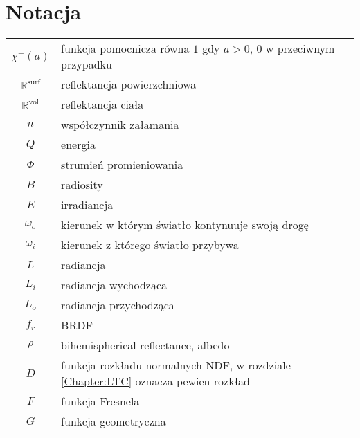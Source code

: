 \documentclass[../main.tex]{subfiles}
\begin{document}
\chapter*{Notacja}

\begin{tabularx}{\textwidth}{cl}
  $\chi^{+}(a)$ 
  & funkcja pomocnicza równa $1$ gdy $a>0$, 0 w przeciwnym przypadku \\
  
  $\mathbb{R}^{\text{surf}}$
  & reflektancja powierzchniowa \\
  
  $\mathbb{R}^{\text{vol}}$
  & reflektancja ciała \\
  
  $n$
  & współczynnik załamania \\
  
  $Q$
  & energia \\
  
  $\Phi$ 
  & strumień promieniowania \\
  
  $B$
  & radiosity \\
  
  $E$
  & irradiancja \\
  
  $\omega_o$
  & kierunek w którym światło kontynuuje swoją drogę \\
  
  $\omega_i$
  & kierunek z którego światło przybywa \\
  
  $L$
  & radiancja \\
  
  $L_i$
  & radiancja wychodząca \\
  
  $L_o$
  & radiancja przychodząca \\
  
  $f_r$
  & BRDF \\
  
  $\rho$ 
  & bihemispherical reflectance, albedo \\
  
  $D$
  & funkcja rozkładu normalnych NDF, w rozdziale \ref{Chapter:LTC} oznacza pewien rozkład \\
  
  $F$
  & funkcja Fresnela \\
  
  $G$ 
  & funkcja geometryczna \\  
\end{tabularx}
\end{document}
